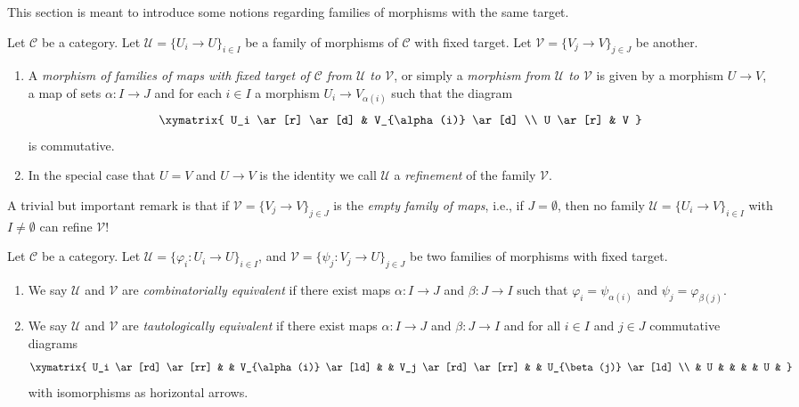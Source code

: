\noindent
This section is meant to introduce some notions regarding
families of morphisms with the same target.

\begin{definition}
\label{definition-morphism-coverings}
Let $\mathcal{C}$ be a category.
Let $\mathcal{U} = \{U_i \to U\}_{i\in I}$ be a family
of morphisms of $\mathcal{C}$ with fixed target.
Let $\mathcal{V} = \{V_j \to V\}_{j\in J}$ be another.
\begin{enumerate}
\item
A {\it morphism of families of maps with fixed target
of $\mathcal{C}$ from  $\mathcal{U}$ to $\mathcal{V}$},
or simply a {\it morphism from $\mathcal{U}$ to $\mathcal{V}$}
is given by a morphism $U \to V$, a map of sets
$\alpha : I \to J$ and for each $i\in I$
a morphism $U_i \to V_{\alpha(i)}$ such that the diagram
$$
\xymatrix{
U_i \ar[r] \ar[d]
&
V_{\alpha(i)} \ar[d]
\\
U \ar[r]
&
V
}
$$
is commutative.
\item In the special case that $U = V$ and $U \to V$ is the identity
we call $\mathcal{U}$ a {\it refinement} of the family $\mathcal{V}$.
\end{enumerate}
\end{definition}

\noindent
A trivial but important remark is that if
$\mathcal{V} = \{V_j \to V\}_{j \in J}$
is the {\it empty family of maps}, i.e., if $J = \emptyset$, then no
family $\mathcal{U} = \{U_i \to V\}_{i \in I}$ with $I \not = \emptyset$
can refine $\mathcal{V}$!

\begin{definition}
\label{definition-combinatorial-tautological}
Let $\mathcal{C}$ be a category.
Let $\mathcal{U} = \{\varphi_i : U_i \to U\}_{i\in I}$, and
$\mathcal{V} = \{\psi_j : V_j \to U\}_{j\in J}$ be two families of morphisms
with fixed target.
\begin{enumerate}
\item  We say $\mathcal{U}$ and $\mathcal{V}$ are
{\it combinatorially equivalent}
if there exist maps
$\alpha : I \to J$ and $\beta : J\to I$ such that
$\varphi_i = \psi_{\alpha(i)}$ and $\psi_j = \varphi_{\beta(j)}$.
\item We say $\mathcal{U}$ and $\mathcal{V}$ are
{\it tautologically equivalent} if there exist maps
$\alpha : I \to J$ and $\beta : J\to I$ and
for all $i\in I$ and $j \in J$ commutative diagrams
$$
\xymatrix{
U_i \ar[rd] \ar[rr] & &
V_{\alpha(i)} \ar[ld] & &
V_j \ar[rd] \ar[rr] & &
U_{\beta(j)} \ar[ld] \\
&
U & & & &
U &
}
$$
with isomorphisms as horizontal arrows.
\end{enumerate}
\end{definition}


